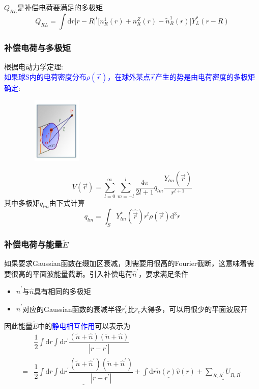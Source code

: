 {{	$Q_{RL}$是补偿电荷要满足的多极矩
	$$Q_{RL}=\int\mathrm{d}r|r-R|^l\big[n_R^1(r)+n_R^Z(r)-\tilde n_R^1(r)\big]Y_L^{\ast}(r-R)$$
}

\frame
{
\frametitle{补偿电荷与多极矩}
根据电动力学定理:\\\textcolor{blue}{如果球\textrm{S}内的电荷密度分布$\rho(\vec r)$，在球外某点$\vec r$产生的势是由电荷密度的多极矩确定}:
\begin{figure}[h!]
\vspace*{-15pt}
\centering
\includegraphics[height=1.25in,width=1.32in,viewport=1 22 507 575,clip]{Figures/potential_multipole.jpg}
\label{Potential-multipole-copy}
\end{figure}
\begin{displaymath}
	V(\vec r)=\sum_{l=0}^{\infty}\sum_{m=-l}^{l}\dfrac{4\pi}{2l+1}q_{lm}\dfrac{Y_{lm}(\hat{\vec r})}{r^{l+1}}
\end{displaymath}
其中多极矩$q_{lm}$由下式计算
\begin{displaymath}
	q_{lm}=\int_SY_{lm}^{\ast}(\hat{\vec r})r^l\rho(\vec r)\mathrm{d}^3r
\end{displaymath}
}

\frame
{
	\frametitle{补偿电荷与能量$\tilde E$}
	如果要求\textrm{Gaussian}函数在缀加区衰减，则需要用很高的\textrm{Fourier}截断，这意味着需要很高的平面波能量截断。引入补偿电荷$\hat n^{\prime}$，要求满足条件
	\begin{itemize}
		\item $\hat n^{\prime}$与$\hat n$具有相同的多极矩
		\item $\hat n^{\prime}$对应的\textrm{Gaussian}函数的衰减半径$r_c^{\prime}$比$r_c$大得多，可以用很少的平面波展开
	\end{itemize}
	因此能量$\tilde E$中的\textcolor{blue}{静电相互作用}可以表示为
	\begin{displaymath}
		\begin{aligned}
			&\dfrac12\int\mathrm{d}r\int\mathrm{d}r^{\prime}\dfrac{(\tilde n+\hat n)(\tilde n+\hat n)}{|r-r^{\prime}|}\\
			=&\underline{\dfrac12\int\mathrm{d}r\int\mathrm{d}r^{\prime}\dfrac{(\tilde n+\hat n^{\prime})(\tilde n+\hat n^{\prime})}{|r-r^{\prime}|}}
			+\underline{\int\mathrm{d}r\tilde n(r)\hat v(r)}+\underline{\sum_{R,R^{\prime}}U_{R,R^{\prime}}}
		\end{aligned}
	\end{displaymath}
}

}
